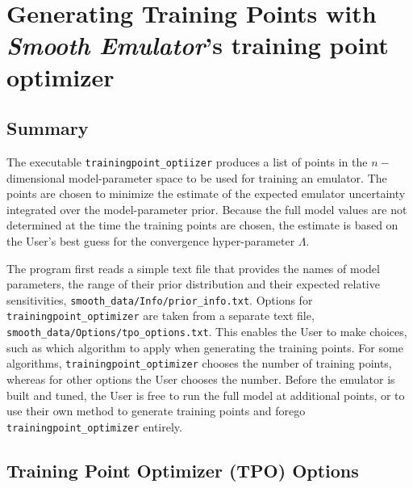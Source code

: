 \documentclass[UserManual.tex]{subfiles}
\begin{document}
\setcounter{section}{2}

\section{Generating Training Points with {\it Smooth Emulator}'s training point optimizer}\label{sec:tpo}

\subsection{Summary}
The executable {\tt trainingpoint\_optiizer} produces a list of points in the $n-$dimensional model-parameter space to be used for training an emulator. The points are chosen to minimize the estimate of the expected emulator uncertainty integrated over the model-parameter prior. Because the full model values are not determined at the time the training points are chosen, the estimate is based on the User's best guess for the convergence hyper-parameter $\Lambda$. 

The program first reads a simple text file that provides the names of model parameters, the range of their prior distribution and their expected relative sensitivities, {\tt smooth\_data/Info/prior\_info.txt}. Options for {\tt trainingpoint\_optimizer} are taken from a separate text file, {\tt smooth\_data/Options/tpo\_options.txt}. This enables the User to make choices, such as which algorithm to apply when generating the training points. For some algorithms, {\tt trainingpoint\_optimizer} chooses the number of training points, whereas for other options the User chooses the number. Before the emulator is built and tuned, the User is free to run the full model at additional points, or to use their own method to generate training points and forego {\tt trainingpoint\_optimizer} entirely.

\subsection{Training Point Optimizer (TPO) Options}
\end{document}

